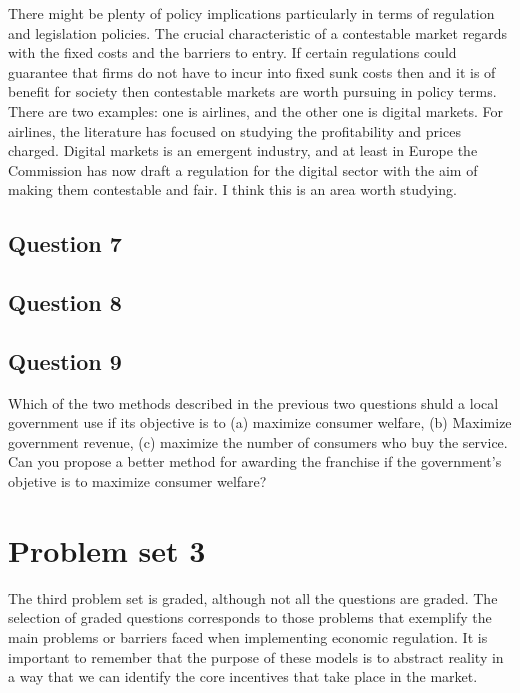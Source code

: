 \documentclass[11pt]{article} %
\begin{document}
There might be plenty of policy implications particularly in terms of regulation and legislation policies. The crucial characteristic of a contestable market regards with the fixed costs and the barriers to entry. If certain regulations could guarantee that firms do not have to incur into fixed sunk costs then and it is of benefit for society then contestable markets are worth pursuing in policy terms. There are two examples: one is airlines, and the other one is digital markets. For airlines, the literature has focused on studying the profitability and prices charged. Digital markets is an emergent industry, and at least in Europe the Commission has now draft a regulation for the digital sector with the aim of making them contestable and fair. I think this is an area worth studying.


\subsection{Question 7}

\subsection{Question 8}

\subsection{Question 9}
Which of the two methods described in the previous two questions shuld a local government use if its objective is to (a) maximize consumer welfare, (b) Maximize government revenue, (c) maximize the number of consumers who buy the service. 
Can you propose a better method for awarding the franchise if the government's objetive is to maximize consumer welfare?


\section{Problem set 3}

The third problem set is graded, although not all the questions are graded. The selection of graded questions corresponds to those problems that exemplify the main problems or barriers faced when implementing economic regulation. It is important to remember that the purpose of these models is to abstract reality in a way that we can identify the core incentives that take place in the market.
\end{document}
